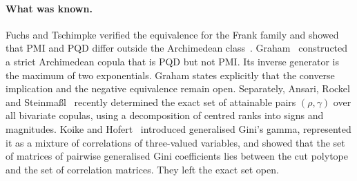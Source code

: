 \documentclass[11pt,a4paper]{article}
\theoremstyle{remark}
\begin{document}
\paragraph{What was known.} Fuchs and Tschimpke verified the equivalence for the Frank family and showed that PMI and PQD differ outside the Archimedean class~\cite{FT}. Graham~\cite{graham} constructed a strict Archimedean copula that is PQD but not PMI. Its inverse generator is the maximum of two exponentials. Graham states explicitly that the converse implication and the negative equivalence remain open. Separately, Ansari, Rockel and Steinma{\ss}l~\cite{ars} recently determined the exact set of attainable pairs $(\rho,\gamma)$ over all bivariate copulas, using a decomposition of centred ranks into signs and magnitudes. Koike and Hofert~\cite{kh} introduced generalised Gini's gamma, represented it as a mixture of correlations of three-valued variables, and showed that the set of matrices of pairwise generalised Gini coefficients lies between the cut polytope and the set of correlation matrices. They left the exact set open.
\end{document}
